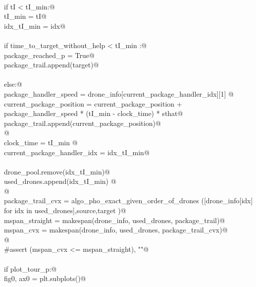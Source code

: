 \documentclass[10.0pt]{report}
\begin{document}
\begin{flushleft}
\begin{list}{}{}
\mbox{}\verb@@\\
\mbox{}\verb@                if tI < tI_min:@\\
\mbox{}\verb@                   tI_min     = tI@\\
\mbox{}\verb@                   idx_tI_min = idx@\\
\mbox{}\verb@@\\
\mbox{}\verb@          if time_to_target_without_help < tI_min :@\\
\mbox{}\verb@              package_reached_p = True@\\
\mbox{}\verb@              package_trail.append(target)@\\
\mbox{}\verb@@\\
\mbox{}\verb@          else:@\\
\mbox{}\verb@              package_handler_speed    = drone_info[current_package_handler_idx][1] @\\
\mbox{}\verb@              current_package_position = current_package_position + package_handler_speed * (tI_min - clock_time) *  sthat@\\
\mbox{}\verb@              package_trail.append(current_package_position)@\\
\mbox{}\verb@    @\\
\mbox{}\verb@              clock_time                  = tI_min @\\
\mbox{}\verb@              current_package_handler_idx = idx_tI_min@\\
\mbox{}\verb@@\\
\mbox{}\verb@              drone_pool.remove(idx_tI_min)@\\
\mbox{}\verb@              used_drones.append(idx_tI_min)  @\\
\mbox{}\verb@   @\\
\mbox{}\verb@    package_trail_cvx = algo_pho_exact_given_order_of_drones ([drone_info[idx] for idx in used_drones],source,target )@\\
\mbox{}\verb@    mspan_straight = makespan(drone_info, used_drones, package_trail)@\\
\mbox{}\verb@    mspan_cvx      = makespan(drone_info, used_drones, package_trail_cvx)@\\
\mbox{}\verb@    @\\
\mbox{}\verb@    #assert (mspan_cvx <= mspan_straight), ""@\\
\mbox{}\verb@@\\
\mbox{}\verb@    if plot_tour_p:@\\
\mbox{}\verb@         fig0, ax0 = plt.subplots()@\\

\end{list}
\end{flushleft}
\end{document}
